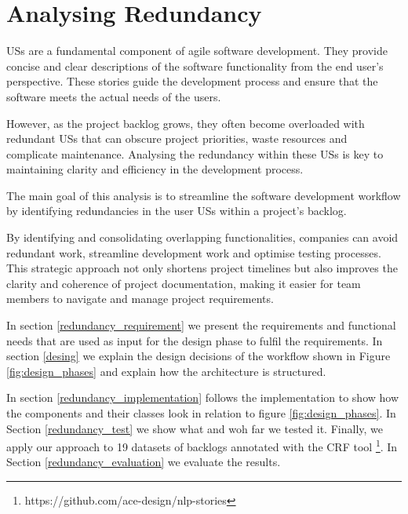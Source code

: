 \section{Analysing Redundancy}\label{redundancy}
USs are a fundamental component of agile software development. They provide concise and clear descriptions of the software functionality from the end user's perspective. These stories guide the development process and ensure that the software meets the actual needs of the users. 

However, as the project backlog grows, they often become overloaded with redundant USs that can obscure project priorities, waste resources and complicate maintenance. Analysing the redundancy within these USs is key to maintaining clarity and efficiency in the development process.

The main goal of this analysis is to streamline the software development workflow by identifying redundancies in the user USs within a project's backlog.

 By identifying and consolidating overlapping functionalities, companies can avoid redundant work, streamline development work and optimise testing processes. This strategic approach not only shortens project timelines but also improves the clarity and coherence of project documentation, making it easier for team members to navigate and manage project requirements.

In section \ref{redundancy_requirement} we present the requirements and functional needs that are used as input for the design phase to fulfil the requirements. In section \ref{desing} we explain the design decisions of the workflow shown in Figure \ref{fig:design_phases} and explain how the architecture is structured. 

In section \ref{redundancy_implementation} follows the implementation to show how the components and their classes look in relation to figure \ref{fig:design_phases}. In Section \ref{redundancy_test} we show what and woh far we tested it. Finally, we apply our approach to 19 datasets of backlogs annotated with the CRF tool \footnote {https://github.com/ace-design/nlp-stories}. In Section \ref{redundancy_evaluation} we evaluate the results.

